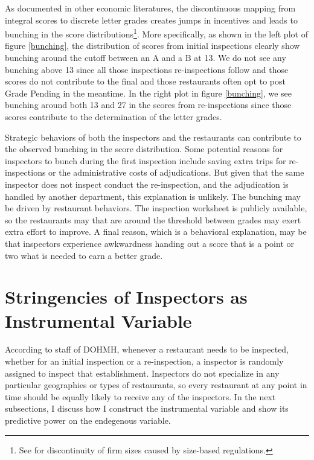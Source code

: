 \documentclass[11pt]{article}
\begin{document}
As documented in other economic literatures, the discontinuous mapping from integral scores to discrete letter grades creates jumps in incentives and leads to bunching in the score distributions\footnote{See \cite{Gourio_Roys_14} for discontinuity of firm sizes caused by size-based regulations.}. More specifically, as shown in the left plot of figure \ref{bunching}, the distribution of scores from initial inspections clearly show bunching around the cutoff between an A and a B at 13. We do not see any bunching above 13 since all those inspections re-inspections follow and those scores do not contribute to the final  and those restaurants often opt to post Grade Pending in the meantime. In the right plot in figure \ref{bunching}, we see bunching around both 13 and 27 in the scores from re-inspections since those scores contribute to the determination of the letter grades. 

Strategic behaviors of both the inspectors and the restaurants can contribute to the observed bunching in the score distribution. Some potential reasons for inspectors to bunch during the first inspection include saving extra trips for re-inspections or the administrative costs of adjudications. But given that the same inspector does not inspect conduct the re-inspection, and the adjudication is handled by another department, this explanation is unlikely. The bunching may be driven by restaurant behaviors. The inspection worksheet is publicly available, so the restaurants may that are around the threshold between grades may exert extra effort to improve. A final reason, which is a behavioral explanation, may be that inspectors experience awkwardness handing out a score that is a point or two what is needed to earn a better grade. 

\section{Stringencies of Inspectors as Instrumental Variable}
\label{IV}
According to staff of DOHMH, whenever a restaurant needs to be inspected, whether for an initial inspection or a re-inspection, a inspector is randomly assigned to inspect that establishment. Inspectors do not specialize in any particular geographies or types of restaurants, so every restaurant at any point in time should be equally likely to receive any of the inspectors. In the next subsections, I discuss how I construct the instrumental variable and show its predictive power on the endegenous variable. 
 
\end{document}
